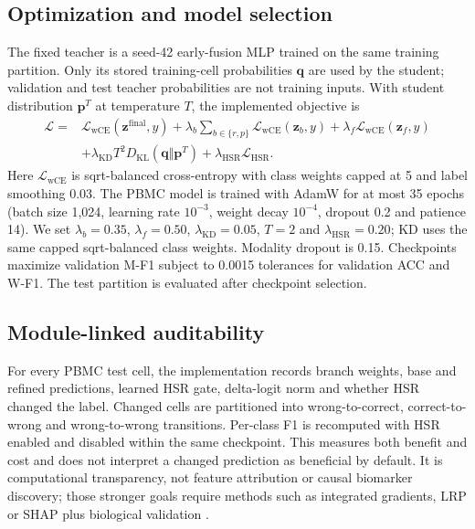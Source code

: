\documentclass[unnumsec,webpdf,contemporary,large,numbered]{oup-authoring-template}
\begin{document}
\subsection{Optimization and model selection}

The fixed teacher is a seed-42 early-fusion MLP trained on the same training partition. Only its stored training-cell probabilities $\mathbf{q}$ are used by the student; validation and test teacher probabilities are not training inputs. With student distribution $\mathbf{p}^{T}$ at temperature $T$, the implemented objective is
\begin{equation}
\begin{split}
\mathcal{L}={}&\mathcal{L}_{\mathrm{wCE}}(\mathbf{z}^{\mathrm{final}},y)
+\lambda_b\sum_{b\in\{r,p\}}\mathcal{L}_{\mathrm{wCE}}(\mathbf{z}_b,y)
+\lambda_f\mathcal{L}_{\mathrm{wCE}}(\mathbf{z}_f,y)\\
&+\lambda_{\mathrm{KD}}T^2D_{\mathrm{KL}}(\mathbf{q}\Vert\mathbf{p}^{T})
+\lambda_{\mathrm{HSR}}\mathcal{L}_{\mathrm{HSR}}.
\end{split}
\end{equation}
Here $\mathcal{L}_{\mathrm{wCE}}$ is sqrt-balanced cross-entropy with class weights capped at 5 and label smoothing 0.03. The PBMC model is trained with AdamW for at most 35 epochs (batch size 1,024, learning rate $10^{-3}$, weight decay $10^{-4}$, dropout 0.2 and patience 14). We set $\lambda_b=0.35$, $\lambda_f=0.50$, $\lambda_{\mathrm{KD}}=0.05$, $T=2$ and $\lambda_{\mathrm{HSR}}=0.20$; KD uses the same capped sqrt-balanced class weights. Modality dropout is 0.15. Checkpoints maximize validation M-F1 subject to 0.0015 tolerances for validation ACC and W-F1. The test partition is evaluated after checkpoint selection.

\subsection{Module-linked auditability}

For every PBMC test cell, the implementation records branch weights, base and refined predictions, learned HSR gate, delta-logit norm and whether HSR changed the label. Changed cells are partitioned into wrong-to-correct, correct-to-wrong and wrong-to-wrong transitions. Per-class F1 is recomputed with HSR enabled and disabled within the same checkpoint. This measures both benefit and cost and does not interpret a changed prediction as beneficial by default. It is computational transparency, not feature attribution or causal biomarker discovery; those stronger goals require methods such as integrated gradients, LRP or SHAP plus biological validation \citep{ribeiro2016,sundararajan2017,montavon2019,samek2021,lundberg2017}.
\end{document}
